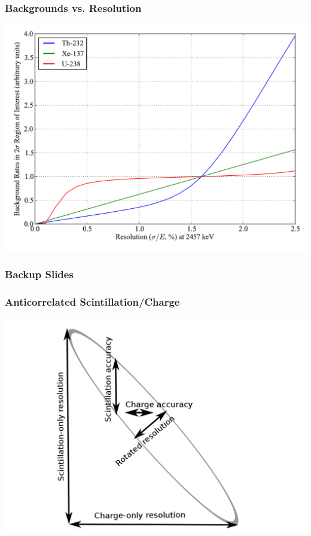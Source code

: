 \documentclass{beamer}
\begin{document}
\begin{frame}
\begin{center}
\frametitle{Backgrounds vs. Resolution}
\end{center}
\vspace{1cm}
\includegraphics[keepaspectratio=true,width=\textwidth]{BackgroundsVsRes.pdf}
\end{frame}




\begin{frame}
\frametitle{Backup Slides}
\end{frame}

\begin{frame}
\begin{center}
\frametitle{Anticorrelated Scintillation/Charge}
\end{center}
\vspace{.5cm}
\begin{center}
\includegraphics[keepaspectratio=true,width=\textwidth]{RotatedIsland.png}
\end{center}
\end{frame}

\end{document}

